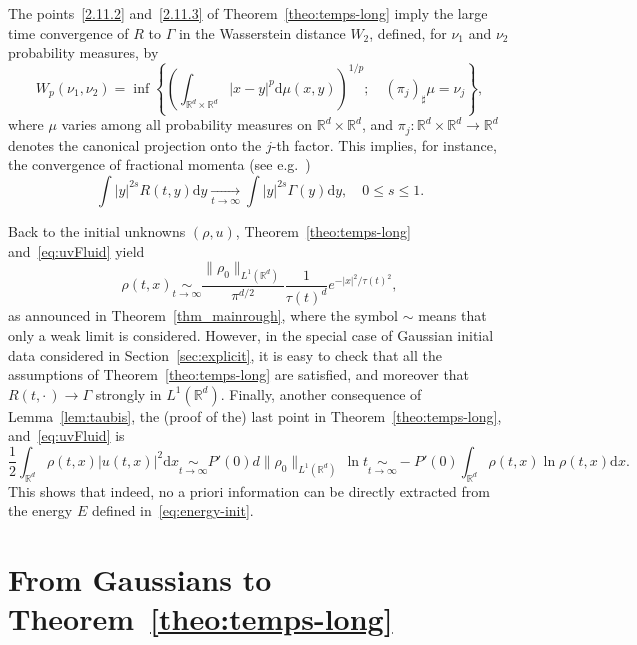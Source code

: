 \documentclass[AHL,Unicode,longabstracts]{cedram}
\newcommand*\R{\mathbb{R}}
\newcommand*\dd {\mathrm{d}}
\newcommand*\<{\left\langle}
\renewcommand*\>{\right\rangle}
\renewcommand*\le{\leqslant}
\newcommand*\Eq[2]{\mathop{\sim}\limits_{#1\rightarrow#2}}
\newcommand*\Tend[2]{\mathop{\longrightarrow}\limits_{#1\rightarrow#2}}
\begin{document}
\begin{rema}
The points~\eqref{2.11.2} and~\eqref{2.11.3} of Theorem~\ref{theo:temps-long} imply the large time convergence of $R$ to $\Gamma$ in the Wasserstein distance $W_2$, defined, for $\nu_1$ and $\nu_2$ probability measures, by
\begin{equation*}
W_p(\nu_1,\nu_2)=\inf \left\{ \left(\int_{{\mathbb R}^d\times {\mathbb R}^d}|x-y|^p\dd \mu(x,y)\right)^{1/p};\quad (\pi_j)_\sharp
\mu=\nu_j\right\},
\end{equation*}
where $\mu$ varies among all probability measures on ${\mathbb R}^d\times {\mathbb R}^d$, and $\pi_j:{\mathbb R}^d\times {\mathbb R}^d\to {\mathbb R}^d$ denotes the canonical projection onto the $j$-th factor. This implies, for instance, the convergence of fractional momenta (see e.g.~\cite[Theorem~7.12]{Vi03})
\begin{equation}\label{eq:moment-int}
\int |y|^{2s}R(t,y) \dd y\Tend t \infty \int |y|^{2s}\Gamma(y)\dd y,\quad 0\le s\le 1.
\end{equation}
\end{rema}

Back to the initial unknowns $(\rho,u)$, Theorem~\ref{theo:temps-long} and~\eqref{eq:uvFluid} yield
\begin{equation*}
\rho(t,x)\Eq t \infty
\frac{\|\rho_0\|_{L^1(\R^d)}}{\pi^{d/2}}\frac{1}{\tau(t)^d}e^{-|x|^2/\tau(t)^2},
\end{equation*}
as announced in Theorem~\ref{thm_mainrough}, where the symbol $\sim$ means that only a weak limit is considered. However, in the special case of Gaussian initial data considered in Section~\ref{sec:explicit}, it is easy to check that all the assumptions of Theorem~\ref{theo:temps-long} are satisfied, and moreover that $R(t,\cdot\,)\to \Gamma$ strongly in $L^1(\R^d)$. Finally, another consequence of Lemma~\ref{lem:taubis}, the (proof of the) last point in Theorem~\ref{theo:temps-long}, and~\eqref{eq:uvFluid} is
\begin{equation*}
\frac{1}{2}\int_{\R^d}\rho(t,x) |u(t,x)|^2 \dd x\Eq t \infty P'(0)d\|\rho_0\|_{L^1(\R^d)} \, \ln t \Eq t
\infty -P'(0)\int_{\R^d} \rho(t,x)\ln \rho(t,x)\dd x.
\end{equation*}
This shows that indeed, no a priori information can be directly extracted from the energy $E$ defined in~\eqref{eq:energy-init}.


\section{From Gaussians to Theorem~\ref{theo:temps-long}}\label{sec:longtime}
\end{document}

